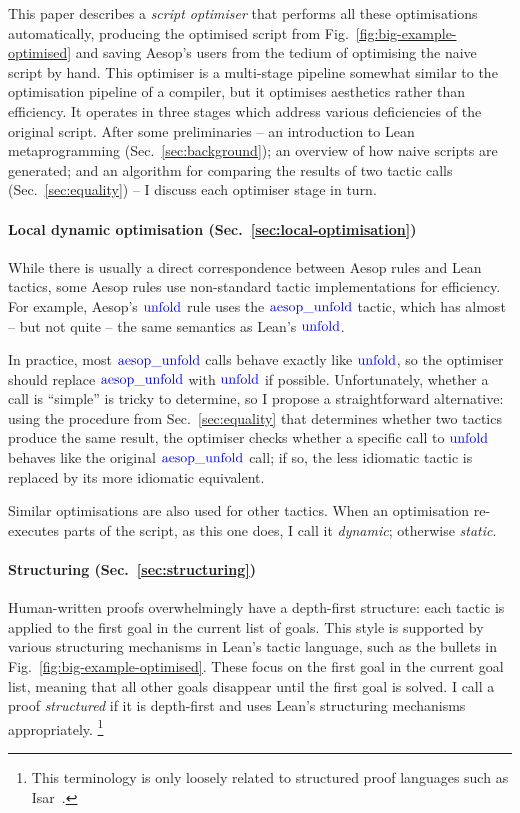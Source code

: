 \documentclass[sigplan,10pt,anonymous,review]{acmart}
\newcommand{\tac}[1]{\ensuremath{\mathrm{\mathcolor{blue}{#1}}}}
\begin{document}
This paper describes a \emph{script optimiser} that performs all these optimisations automatically, producing the optimised script from Fig.~\ref{fig:big-example-optimised} and saving Aesop's users from the tedium of optimising the naive script by hand.
This optimiser is a multi-stage pipeline somewhat similar to the optimisation pipeline of a compiler, but it optimises aesthetics rather than efficiency.
It operates in three stages which address various deficiencies of the original script.
After some preliminaries -- an introduction to Lean metaprogramming (Sec.~\ref{sec:background}); an overview of how naive scripts are generated; and an algorithm for comparing the results of two tactic calls (Sec.~\ref{sec:equality}) -- I discuss each optimiser stage in turn.

\paragraph{Local dynamic optimisation (Sec.~\ref{sec:local-optimisation})}
While there is usually a direct correspondence between Aesop rules and Lean tactics, some Aesop rules use non-standard tactic implementations for efficiency.
For example, Aesop's \tac{unfold} rule uses the \tac{aesop\_unfold} tactic, which has almost -- but not quite -- the same semantics as Lean's \tac{unfold}.

In practice, most \tac{aesop\_unfold} calls behave exactly like \tac{unfold}, so the optimiser should replace \tac{aesop\_unfold} with \tac{unfold} if possible.
Unfortunately, whether a call is \enquote{simple} is tricky to determine, so I propose a straightforward alternative:
using the procedure from Sec.~\ref{sec:equality} that determines whether two tactics produce the same result, the optimiser checks whether a specific call to \tac{unfold} behaves like the original \tac{aesop\_unfold} call; if so, the less idiomatic tactic is replaced by its more idiomatic equivalent.

Similar optimisations are also used for other tactics.
When an optimisation re-executes parts of the script, as this one does, I call it \emph{dynamic}; otherwise \emph{static}.

\paragraph{Structuring (Sec.~\ref{sec:structuring})}
Human-written proofs overwhelmingly have a depth-first structure: each tactic is applied to the first goal in the current list of goals.
This style is supported by various structuring mechanisms in Lean's tactic language, such as the bullets in Fig.~\ref{fig:big-example-optimised}.
These focus on the first goal in the current goal list, meaning that all other goals disappear until the first goal is solved.
I call a proof \emph{structured} if it is depth-first and uses Lean's structuring mechanisms appropriately.%
\footnote{This terminology is only loosely related to structured proof languages such as Isar~\cite{Isar}.}
\end{document}
